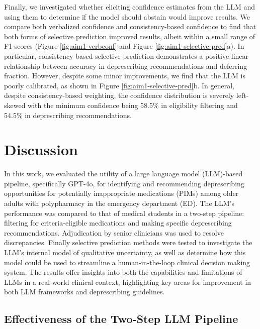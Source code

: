 Finally, we investigated whether eliciting confidence estimates from the LLM and using them to determine if the model should abstain would improve results. We compare both verbalized confidence and consistency-based confidence to find that both forms of selective prediction improved results, albeit within a small range of F1-scores (Figure \ref{fig:aim1-verbconf} and Figure \ref{fig:aim1-selective-pred}a). In particular, consistency-based selective prediction demonstrates a positive linear relationship between accuracy in deprescribing recommendations and deferring fraction. However, despite some minor improvements, we find that the LLM is poorly calibrated, as shown in Figure \ref{fig:aim1-selective-pred}b. In general, despite consistency-based weighting, the confidence distribution is severely left-skewed with the minimum confidence being 58.5\% in eligibility filtering and 54.5\% in deprescribing recommendations. 


\section{Discussion}

In this work, we evaluated the utility of a large language model (LLM)-based pipeline, specifically GPT-4o, for identifying and recommending deprescribing opportunities for potentially inappropriate medications (PIMs) among older adults with polypharmacy in the emergency department (ED). The LLM's performance was compared to that of medical students in a two-step pipeline: filtering for criteria-eligible medications and making specific deprescribing recommendations. Adjudication by senior clinicians was used to resolve discrepancies. Finally selective prediction methods were tested to investigate the LLM's internal model of qualitative uncertainty, as well as determine how this model could be used to streamline a human-in-the-loop clinical decision making system. The results offer insights into both the capabilities and limitations of LLMs in a real-world clinical context, highlighting key areas for improvement in both LLM frameworks and deprescribing guidelines.

\subsection{Effectiveness of the Two-Step LLM Pipeline}


